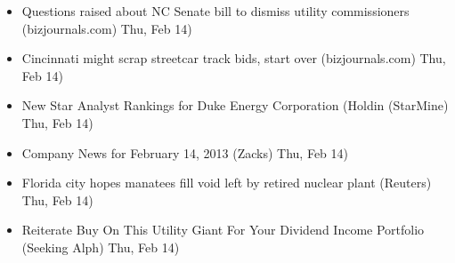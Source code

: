 \documentclass[11pt,asymmetric]{article}
\begin{document}
\begin{itemize}
\item Questions raised about NC Senate bill to dismiss utility commissioners (bizjournals.com) Thu, Feb 14)
\item Cincinnati might scrap streetcar track bids, start over (bizjournals.com) Thu, Feb 14)
\item New Star Analyst Rankings for Duke Energy Corporation (Holdin (StarMine) Thu, Feb 14)
\item Company News for February 14, 2013 (Zacks) Thu, Feb 14)
\item Florida city hopes manatees fill void left by retired nuclear plant (Reuters) Thu, Feb 14)
\item Reiterate Buy On This Utility Giant For Your Dividend Income Portfolio (Seeking Alph) Thu, Feb 14)
\end{itemize}
\end{document}
